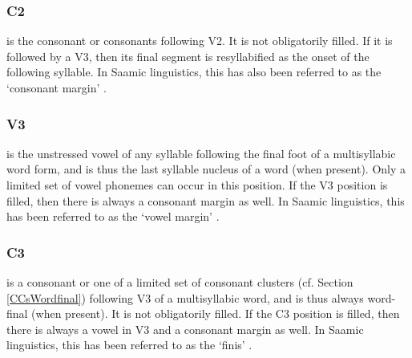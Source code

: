 \subsubsection{C2}\label{CMarg}
 is the consonant or consonants following V2. It is not obligatorily filled. If it is followed by a V3, then its final segment is resyllabified as the onset of the following syllable. 
In Saamic linguistics, this has also been referred to as the ‘consonant margin’ \citep[cf.][39]{Sammallahti1998}.

\subsubsection{V3}\label{v3}
 is the unstressed vowel of any syllable following the final foot of a multisyllabic word form, and is thus the last syllable nucleus of a word (when present). Only a limited set of vowel phonemes can occur in this position. If the V3 position is filled, then there is always a consonant margin as well.  
In Saamic linguistics, this has been referred to as the ‘vowel margin’ \citep[cf.][39]{Sammallahti1998}.

\subsubsection{C3}\label{c3}
 is a consonant or one of a limited set of consonant clusters (cf. Section \ref{CCsWordfinal}) following V3 of a multisyllabic word, and is thus always word-final (when present). It is not obligatorily filled. If the C3 position is filled, then there is always a vowel in V3 and a consonant margin as well. 
In Saamic linguistics, this has been referred to as the ‘finis’ \citep[cf.][39]{Sammallahti1998}.


